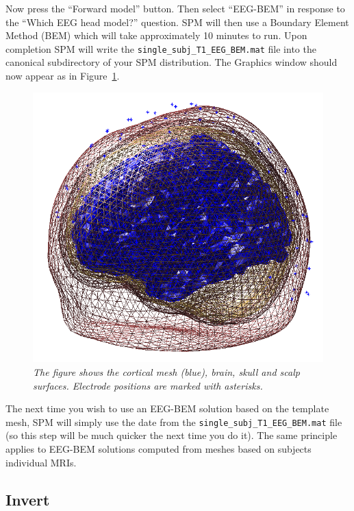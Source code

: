 Now press the ``Forward model'' button. Then select ``EEG-BEM'' in response to the ``Which EEG head model?'' question. SPM will then use a Boundary Element Method (BEM) which will take approximately 10 minutes to run. Upon completion SPM will write the \texttt{single\_subj\_T1\_EEG\_BEM.mat} file into the canonical subdirectory of your SPM distribution. The Graphics window should now appear as in Figure~\ref{forward}.
\begin{figure}
\begin{center}
\includegraphics[width=120mm]{mmn/forward}
\caption{\em
The figure shows the cortical mesh (blue), brain, skull and scalp surfaces. Electrode positions are marked with asterisks.
\label{forward}}
\end{center}
\end{figure}
The next time you wish to use an EEG-BEM solution based on the template mesh, SPM will simply use the date from the \texttt{single\_subj\_T1\_EEG\_BEM.mat} file (so this step will be much quicker the next time you do it). The same principle applies to EEG-BEM solutions computed from meshes based on subjects individual MRIs.

\subsection{Invert}

